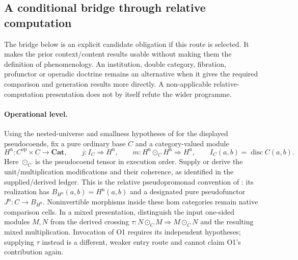 \documentclass[11pt]{article}
\theoremstyle{remark}
\begin{document}
\subsection{A conditional bridge through relative computation}
\label{sec:relative-bridge}

The bridge below is an explicit candidate obligation if this route is selected. It makes the prior context/content results usable without making them the definition of phenomenology. An institution, double category, fibration, profunctor or operadic doctrine remains an alternative when it gives the required comparison and generation results more directly. A non-applicable relative-computation presentation does not by itself refute the wider programme.

\paragraph{Operational level.}
Using the nested-universe and smallness hypotheses of \cite{RelativeConstruction} for the displayed pseudocoends, fix a pure ordinary base $C$ and a category-valued module
\[
 H^{\mathrm n}:C^{\mathrm{op}}\times C\longrightarrow\mathbf{Cat},
 \qquad j:I_C\Rightarrow H^{\mathrm n},\qquad
 m:H^{\mathrm n}\odot_C H^{\mathrm n}\Rightarrow H^{\mathrm n},
 \qquad I_C(a,b)=\operatorname{disc}C(a,b).
\]
Here $\odot_C$ is the pseudocoend tensor in execution order. Supply or derive the unit/multiplication modifications and their coherence, as identified in the supplied/derived ledger. This is the relative pseudopromonad convention of \cite{RelativeConstruction}: its realization has $B_{H^{\mathrm n}}(a,b)=H^{\mathrm n}(a,b)$ and a designated pure pseudofunctor $J^{\mathrm n}:C\to B_{H^{\mathrm n}}$. Noninvertible morphisms inside these hom categories remain native comparison cells. In a mixed presentation, distinguish the input one-sided modules $M,N$ from the derived crossing $\tau:N\odot_C M\Rightarrow M\odot_C N$ and the resulting mixed multiplication. Invocation of O1 requires its independent hypotheses; supplying $\tau$ instead is a different, weaker entry route and cannot claim O1's contribution again.
\end{document}
